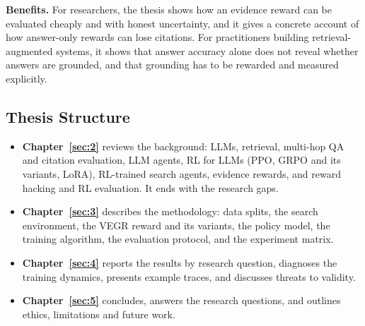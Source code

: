 \textbf{Benefits.} For researchers, the thesis shows how an evidence
reward can be evaluated cheaply and with honest uncertainty, and it
gives a concrete account of how answer-only rewards can lose citations.
For practitioners building retrieval-augmented systems, it shows that
answer accuracy alone does not reveal whether answers are grounded, and
that grounding has to be rewarded and measured explicitly.

\subsection{Thesis Structure}\label{sec:1.6}

\begin{itemize}
\tightlist
\item
  \textbf{Chapter~\ref{sec:2}} reviews the background: LLMs, retrieval,
  multi-hop QA and citation evaluation, LLM agents, RL for LLMs (PPO,
  GRPO and its variants, LoRA), RL-trained search agents, evidence
  rewards, and reward hacking and RL evaluation. It ends with the
  research gaps.
\item
  \textbf{Chapter~\ref{sec:3}} describes the methodology: data splits,
  the search environment, the VEGR reward and its variants, the policy
  model, the training algorithm, the evaluation protocol, and the
  experiment matrix.
\item
  \textbf{Chapter~\ref{sec:4}} reports the results by research question,
  diagnoses the training dynamics, presents example traces, and
  discusses threats to validity.
\item
  \textbf{Chapter~\ref{sec:5}} concludes, answers the research
  questions, and outlines ethics, limitations and future work.
\end{itemize}
